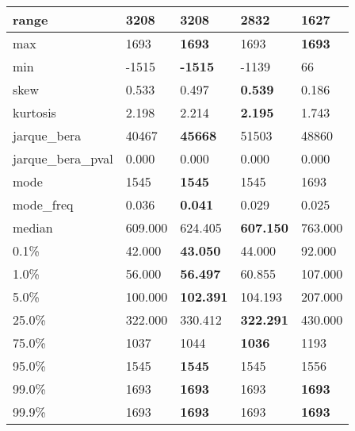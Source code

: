 \begin{table}[H]
\begin{tabular}{|l|m{10em}|m{10em}|m{10em}|m{10em}|}
\hline range & 3208 & \bfseries 3208 & 2832 & \cellcolor[rgb]{0.9, 0.54, 0.52} 1627 \\
\hline max & 1693 & \bfseries 1693 & \cellcolor[rgb]{0.9, 0.54, 0.52} 1693 & \bfseries 1693 \\
\hline min & -1515 & \bfseries -1515 & -1139 & \cellcolor[rgb]{0.9, 0.54, 0.52} 66 \\
\hline skew & 0.533 & 0.497 & \bfseries 0.539 & \cellcolor[rgb]{0.9, 0.54, 0.52} 0.186 \\
\hline kurtosis & 2.198 & 2.214 & \bfseries 2.195 & \cellcolor[rgb]{0.9, 0.54, 0.52} 1.743 \\
\hline jarque\_bera & 40467 & \bfseries 45668 & \cellcolor[rgb]{0.9, 0.54, 0.52} 51503 & 48860 \\
\hline jarque\_bera\_pval & 0.000 & 0.000 & 0.000 & 0.000 \\
\hline mode & 1545 & \bfseries 1545 & 1545 & \cellcolor[rgb]{0.9, 0.54, 0.52} 1693 \\
\hline mode\_freq & 0.036 & \bfseries 0.041 & 0.029 & \cellcolor[rgb]{0.9, 0.54, 0.52} 0.025 \\
\hline median & 609.000 & 624.405 & \bfseries 607.150 & \cellcolor[rgb]{0.9, 0.54, 0.52} 763.000 \\
\hline 0.1\% & 42.000 & \bfseries 43.050 & 44.000 & \cellcolor[rgb]{0.9, 0.54, 0.52} 92.000 \\
\hline 1.0\% & 56.000 & \bfseries 56.497 & 60.855 & \cellcolor[rgb]{0.9, 0.54, 0.52} 107.000 \\
\hline 5.0\% & 100.000 & \bfseries 102.391 & 104.193 & \cellcolor[rgb]{0.9, 0.54, 0.52} 207.000 \\
\hline 25.0\% & 322.000 & 330.412 & \bfseries 322.291 & \cellcolor[rgb]{0.9, 0.54, 0.52} 430.000 \\
\hline 75.0\% & 1037 & 1044 & \bfseries 1036 & \cellcolor[rgb]{0.9, 0.54, 0.52} 1193 \\
\hline 95.0\% & 1545 & \bfseries 1545 & 1545 & \cellcolor[rgb]{0.9, 0.54, 0.52} 1556 \\
\hline 99.0\% & 1693 & \bfseries 1693 & \cellcolor[rgb]{0.9, 0.54, 0.52} 1693 & \bfseries 1693 \\
\hline 99.9\% & 1693 & \bfseries 1693 & \cellcolor[rgb]{0.9, 0.54, 0.52} 1693 & \bfseries 1693 \\
\hline
\end{tabular}
\end{table}
